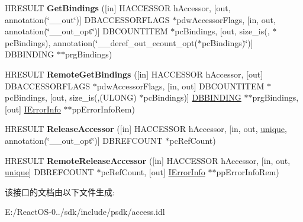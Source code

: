 \begin{DoxyCompactItemize}
\item 
\mbox{\label{interface_i_accessor_a42bc602773d0dd9dd575da5dad5929b0}} 
H\+R\+E\+S\+U\+LT {\bfseries Get\+Bindings} (\mbox{[}in\mbox{]} H\+A\+C\+C\+E\+S\+S\+OR h\+Accessor, \mbox{[}out, annotation(\char`\"{}\+\_\+\+\_\+out\char`\"{})\mbox{]} D\+B\+A\+C\+C\+E\+S\+S\+O\+R\+F\+L\+A\+GS $\ast$pdw\+Accessor\+Flags, \mbox{[}in, out, annotation(\char`\"{}\+\_\+\+\_\+out\+\_\+opt\char`\"{})\mbox{]} D\+B\+C\+O\+U\+N\+T\+I\+T\+EM $\ast$pc\+Bindings, \mbox{[}out, size\+\_\+is(, $\ast$pc\+Bindings), annotation(\char`\"{}\+\_\+\+\_\+deref\+\_\+out\+\_\+ecount\+\_\+opt($\ast$pc\+Bindings)\char`\"{})\mbox{]} D\+B\+B\+I\+N\+D\+I\+NG $\ast$$\ast$prg\+Bindings)
\item 
\mbox{\label{interface_i_accessor_acf43385cbb389a1aaf2c72172ddf2bb3}} 
H\+R\+E\+S\+U\+LT {\bfseries Remote\+Get\+Bindings} (\mbox{[}in\mbox{]} H\+A\+C\+C\+E\+S\+S\+OR h\+Accessor, \mbox{[}out\mbox{]} D\+B\+A\+C\+C\+E\+S\+S\+O\+R\+F\+L\+A\+GS $\ast$pdw\+Accessor\+Flags, \mbox{[}in, out\mbox{]} D\+B\+C\+O\+U\+N\+T\+I\+T\+EM $\ast$pc\+Bindings, \mbox{[}out, size\+\_\+is(,(U\+L\+O\+NG) $\ast$pc\+Bindings)\mbox{]} \hyperlink{structtag_d_b_b_i_n_d_i_n_g}{D\+B\+B\+I\+N\+D\+I\+NG} $\ast$$\ast$prg\+Bindings, \mbox{[}out\mbox{]} \hyperlink{interface_i_error_info}{I\+Error\+Info} $\ast$$\ast$pp\+Error\+Info\+Rem)
\item 
\mbox{\label{interface_i_accessor_a38ba3286c7a2a1193b913759179e34bf}} 
H\+R\+E\+S\+U\+LT {\bfseries Release\+Accessor} (\mbox{[}in\mbox{]} H\+A\+C\+C\+E\+S\+S\+OR h\+Accessor, \mbox{[}in, out, \hyperlink{interfaceunique}{unique}, annotation(\char`\"{}\+\_\+\+\_\+out\+\_\+opt\char`\"{})\mbox{]} D\+B\+R\+E\+F\+C\+O\+U\+NT $\ast$pc\+Ref\+Count)
\item 
\mbox{\label{interface_i_accessor_ab5408122ab04d13fba80fff5e4cd3a96}} 
H\+R\+E\+S\+U\+LT {\bfseries Remote\+Release\+Accessor} (\mbox{[}in\mbox{]} H\+A\+C\+C\+E\+S\+S\+OR h\+Accessor, \mbox{[}in, out, \hyperlink{interfaceunique}{unique}\mbox{]} D\+B\+R\+E\+F\+C\+O\+U\+NT $\ast$pc\+Ref\+Count, \mbox{[}out\mbox{]} \hyperlink{interface_i_error_info}{I\+Error\+Info} $\ast$$\ast$pp\+Error\+Info\+Rem)
\end{DoxyCompactItemize}


该接口的文档由以下文件生成\+:\begin{DoxyCompactItemize}
\item 
E\+:/\+React\+O\+S-\/0../sdk/include/psdk/access.\+idl\end{DoxyCompactItemize}
